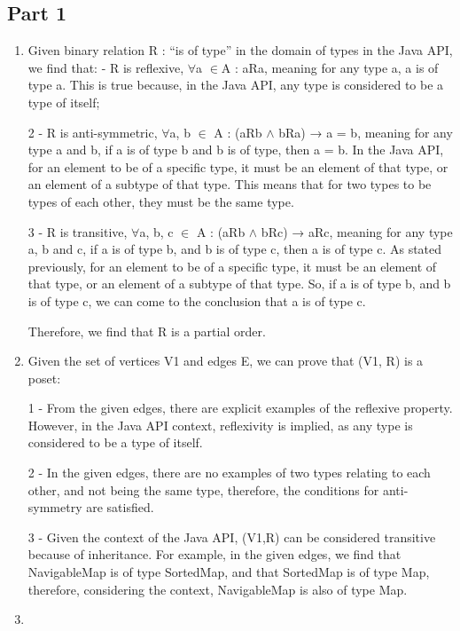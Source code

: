 \documentclass[12pt]{article}
\begin{document}
\subsection*{Part 1}
\begin{enumerate}
	\item
	Given binary relation R : “is of type” in the domain of types in the Java API, we find that: - R is reflexive, $\forall$a $\in$A : aRa, meaning for any type a, a is of type a. This is true because, in the Java API, any type is considered to be a type of itself;
	
	2 - R is anti-symmetric, $\forall$a, b $\in$ A : (aRb $\wedge$ bRa) → a = b, meaning for any type a and b, if a is of type b and b is of type, then a = b. In the Java API, for an element to be of a specific type, it must be an element of that type, or an element of a subtype of that type. This means that for two types to be types of each other, they must be the same type.
	
	3 - R is transitive, $\forall$a, b, c $\in$ A : (aRb $\wedge$ bRc) → aRc, meaning for any type a, b and c, if a is of type b, and b is of type c, then a is of type c. As stated previously, for an element to be of a specific type, it must be an element of that type, or an element of a subtype of that type. So, if a is of type b, and b is of type c, we can come to the conclusion that a is of type c.
	
	Therefore, we find that R is a partial order.
	\item
	Given the set of vertices V1 and edges E, we can prove that (V1, R) is a poset:
	
	1 - From the given edges, there are explicit examples of the reflexive property. However, in the Java API context, reflexivity is implied, as any type is considered to be a type of itself.
	
	2 - In the given edges, there are no examples of two types relating to each other, and not being the same type, therefore, the conditions for anti-symmetry are satisfied.
	
	3 - Given the context of the Java API, (V1,R) can be considered transitive because of inheritance. For example, in the given edges, we find that NavigableMap is of type SortedMap, and that SortedMap is of type Map, therefore, considering the context, NavigableMap is also of type Map.
	
	\item
\end{enumerate}
\end{document}
